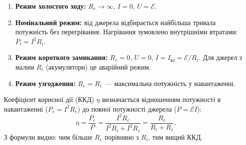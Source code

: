 \documentclass{LabWork}
\begin{document}
\begin{enumerate}
	\item \textbf{Режим холостого ходу:} $R_e \to \infty$, $I = 0$, $U = \mathcal{E}$.
	\item \textbf{Номінальний режим:} від джерела відбирається найбільша тривала потужність без перегрівання. Нагрівання зумовлено внутрішніми втратами: $P_i = I^2 R_i$.
	\item \textbf{Режим короткого замикання:} $R_e = 0$, $U = 0$, $I = I_\text{кз} = \mathcal{E}/R_i$. Для джерел з малим $R_i$ (акумулятори) це аварійний режим.
	\item \textbf{Режим узгодження:} $R_e = R_i$~--- максимальна потужність у навантаженні.
\end{enumerate}


Коефіцієнт корисної дії (ККД) $\eta$ визначається відношенням потужності в навантаженні ($P_e = I^2R_e$) до повної потужності джерела ($P = \mathcal{E}I$):
\begin{equation}\label{eta}
	\eta = \frac{P_e}{P} = \frac{I^2R_e}{I^2R_i + I^2R_e} = \frac{R_e}{R_i + R_e}.
\end{equation}
З формули видно: чим більше $R_e$ порівняно з $R_i$, тим вищий ККД.
\end{document}
